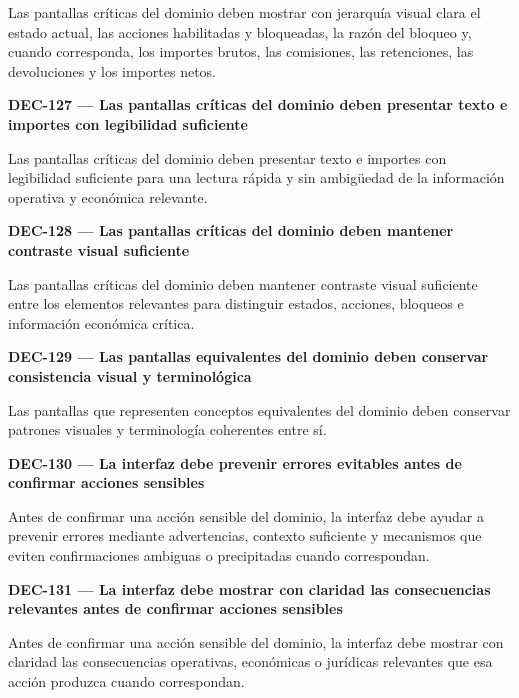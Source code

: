 \documentclass[10pt,letterpaper]{article}
\begin{document}
Las pantallas críticas del dominio deben mostrar con jerarquía visual clara el estado actual, las acciones habilitadas y bloqueadas, la razón del bloqueo y, cuando corresponda, los importes brutos, las comisiones, las retenciones, las devoluciones y los importes netos.\par\vspace{0.45em}
\noindent\textbf{DEC-127 --- Las pantallas críticas del dominio deben presentar texto e importes con legibilidad suficiente}\par
Las pantallas críticas del dominio deben presentar texto e importes con legibilidad suficiente para una lectura rápida y sin ambigüedad de la información operativa y económica relevante.\par\vspace{0.45em}
\noindent\textbf{DEC-128 --- Las pantallas críticas del dominio deben mantener contraste visual suficiente}\par
Las pantallas críticas del dominio deben mantener contraste visual suficiente entre los elementos relevantes para distinguir estados, acciones, bloqueos e información económica crítica.\par\vspace{0.45em}
\noindent\textbf{DEC-129 --- Las pantallas equivalentes del dominio deben conservar consistencia visual y terminológica}\par
Las pantallas que representen conceptos equivalentes del dominio deben conservar patrones visuales y terminología coherentes entre sí.\par\vspace{0.45em}
\noindent\textbf{DEC-130 --- La interfaz debe prevenir errores evitables antes de confirmar acciones sensibles}\par
Antes de confirmar una acción sensible del dominio, la interfaz debe ayudar a prevenir errores mediante advertencias, contexto suficiente y mecanismos que eviten confirmaciones ambiguas o precipitadas cuando correspondan.\par\vspace{0.45em}
\noindent\textbf{DEC-131 --- La interfaz debe mostrar con claridad las consecuencias relevantes antes de confirmar acciones sensibles}\par
Antes de confirmar una acción sensible del dominio, la interfaz debe mostrar con claridad las consecuencias operativas, económicas o jurídicas relevantes que esa acción produzca cuando correspondan.\par\vspace{0.45em}
\end{document}
